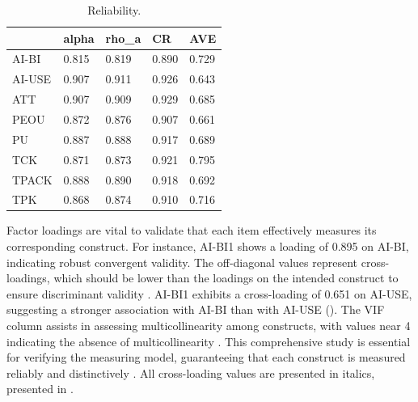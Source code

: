 \documentclass[english]{textolivre}
\begin{document}
\begin{table}[h!]
\centering
\begin{threeparttable}
\caption{Reliability.}
\label{tbl2}
\begin{tabular}{lllll}
\toprule
& alpha & rho\_a & CR & AVE  \\
\midrule
AI-BI & 0.815 & 0.819 & 0.890 & 0.729  \\
AI-USE & 0.907 & 0.911 & 0.926 & 0.643  \\
ATT & 0.907 & 0.909 & 0.929 & 0.685  \\
PEOU & 0.872 & 0.876 & 0.907 & 0.661  \\
PU & 0.887 & 0.888 & 0.917 & 0.689  \\
TCK & 0.871 & 0.873 & 0.921 & 0.795  \\
TPACK & 0.888 & 0.890 & 0.918 & 0.692  \\
TPK & 0.868 & 0.874 & 0.910 & 0.716  \\
\bottomrule
\end{tabular}
\end{threeparttable}
\end{table}

Factor loadings are vital to validate that each item effectively measures its corresponding construct. For instance, AI-BI1 shows a loading of 0.895 on AI-BI, indicating robust convergent validity. The off-diagonal values represent cross-loadings, which should be lower than the loadings on the intended construct to ensure discriminant validity \cite{alharbi2021crypto,riady2025tam}. AI-BI1 exhibits a cross-loading of 0.651 on AI-USE, suggesting a stronger association with AI-BI than with AI-USE (). The VIF column assists in assessing multicollinearity among constructs, with values near 4 indicating the absence of multicollinearity \cite{nadella2024elearning}. This comprehensive study is essential for verifying the measuring model, guaranteeing that each construct is measured reliably and distinctively \cite{cepeda2024plssem,hair2024plssem}. All cross-loading values are presented in italics, presented in .
\end{document}
